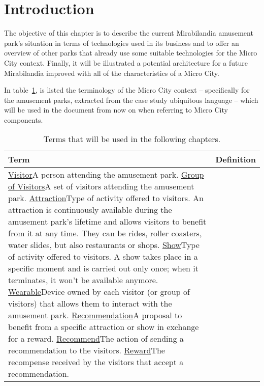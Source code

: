 \section*{Introduction}
\label{sec:introduction}

The objective of this chapter is to describe the current Mirabilandia amusement park's situation in terms of technologies used in its business and to offer an overview of other parks that already use some suitable technologies for the Micro City context.
Finally, it will be illustrated a potential architecture for a future Mirabilandia improved with all of the characteristics of a Micro City.

In table~\ref{tab:terms}, is listed the terminology of the Micro City context -- specifically for the amusement parks, extracted from the case study ubiquitous language -- which will be used in the document from now on when referring to Micro City components.

\begin{longtable}{|l|p{}|}
	\hline
	\textbf{Term} & \textbf{Definition} \\
	\hline
	\ul{Visitor}{A person attending the amusement park.}
	\ul{Group of Visitors}{A set of visitors attending the amusement park.}
	\ul{Attraction}{Type of activity offered to visitors. An attraction is continuously available during the amusement park's lifetime and allows visitors to benefit from it at any time. They can be rides, roller coasters, water slides, but also restaurants or shops.}
	\ul{Show}{Type of activity offered to visitors. A show takes place in a specific moment and is carried out only once; when it terminates, it won't be available anymore.}
	\ul{Wearable}{Device owned by each visitor (or group of visitors) that allows them to interact with the amusement park.}
	\ul{Recommendation}{A proposal to benefit from a specific attraction or show in exchange for a reward.}
	\ul{Recommend}{The action of sending a recommendation to the visitors.}
	\ul{Reward}{The recompense received by the visitors that accept a recommendation.}
	\caption{Terms that will be used in the following chapters.}
	\label{tab:terms}
\end{longtable}
